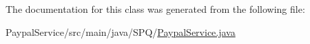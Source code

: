 The documentation for this class was generated from the following file\+:\begin{DoxyCompactItemize}
\item 
Paypal\+Service/src/main/java/\+S\+P\+Q/\mbox{\hyperlink{_paypal_service_8java}{Paypal\+Service.\+java}}\end{DoxyCompactItemize}
